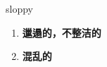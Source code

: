 
\begin{frame}
{\huge sloppy}
\begin{center}
\begin{enumerate}\Large
  \item \textbf{邋遢的，不整洁的}
  \item \textbf{混乱的}
\end{enumerate}
\end{center}
\end{frame}
